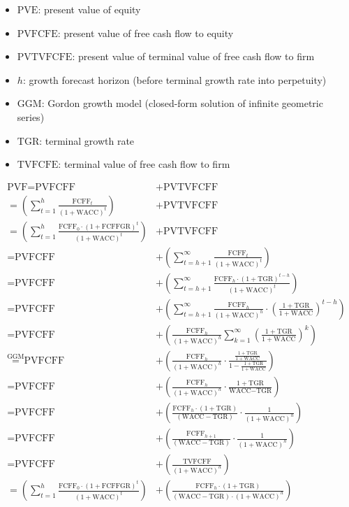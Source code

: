 \begin{itemize}
  \item[] $\text{PVE}$: present value of equity
  \item[] $\text{PVFCFE}$: present value of free cash flow to equity
  \item[] $\text{PVTVFCFE}$: present value of terminal value of free cash flow to firm
  \item[] $h$: growth forecast horizon (before terminal growth rate into perpetuity)
  \item[] $\text{GGM}$: Gordon growth model (closed-form solution of infinite geometric series)
  \item[] $\text{TGR}$: terminal growth rate
  \item[] $\text{TVFCFE}$: terminal value of free cash flow to firm
\end{itemize}

$$
\begin{aligned}
\text{PVF} = \text{PVFCFF} &+ \text{PVTVFCFF} \\ 
= \left( \sum_{t=1}^{h} \frac{\text{FCFF}_t}{(1 + \text{WACC})^t} \right) &+ \text{PVTVFCFF} \\
= \left( \sum_{t=1}^{h} \frac{\text{FCFF}_0 \cdot (1+\text{FCFFGR})^t}{(1+\text{WACC})^t} \right) &+ \text{PVTVFCFF} \\
= \text{PVFCFF} &+ \left( \sum_{t=h+1}^{\infty} \frac{\text{FCFF}_t}{(1 + \text{WACC})^t} \right) \\
= \text{PVFCFF} &+ \left( \sum_{t=h+1}^{\infty} \frac{\text{FCFF}_h \cdot (1+\text{TGR})^{t-h}}{(1+\text{WACC})^t} \right) \\
= \text{PVFCFF} &+ \left( \sum_{t=h+1}^{\infty} \frac{\text{FCFF}_h}{(1+\text{WACC})^h} \cdot \left( \frac{1+\text{TGR}}{1+\text{WACC}} \right)^{t-h} \right) \\
= \text{PVFCFF} &+ \left( \frac{\text{FCFF}_h}{(1+\text{WACC})^h} \sum_{k=1}^{\infty} \left( \frac{1+\text{TGR}}{1+\text{WACC}} \right)^k \right) \\
\overset{\text{GGM}}{=} \text{PVFCFF} &+ \left( \frac{\text{FCFF}_h}{(1+\text{WACC})^h} \cdot \frac{\frac{1+\text{TGR}}{1+\text{WACC}}}{1 - \frac{1+\text{TGR}}{1+\text{WACC}}} \right) \\
= \text{PVFCFF} &+ \left( \frac{\text{FCFF}_h}{(1+\text{WACC})^h} \cdot \frac{1+\text{TGR}}{\text{WACC} - \text{TGR}} \right) \\
= \text{PVFCFF} &+ \left( \frac{\text{FCFF}_h \cdot (1+\text{TGR})}{(\text{WACC} - \text{TGR})} \cdot \frac{1}{(1+\text{WACC})^h} \right) \\ 
= \text{PVFCFF} &+ \left( \frac{\text{FCFF}_{h+1}}{(\text{WACC} - \text{TGR})} \cdot \frac{1}{(1 + \text{WACC})^h} \right) \\
= \text{PVFCFF} &+ \left( \frac{\text{TVFCFF}}{(1 + \text{WACC})^h} \right) \\ 
= \left( \sum_{t=1}^{h} \frac{\text{FCFF}_0 \cdot (1+\text{FCFFGR})^t}{(1+\text{WACC})^t} \right) &+ \left( \frac{\text{FCFF}_h \cdot (1+\text{TGR})}{(\text{WACC} - \text{TGR}) \cdot (1 + \text{WACC})^h} \right)
\end{aligned}
$$

